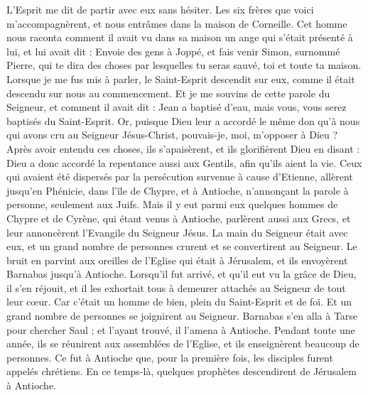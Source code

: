 \begin{multicols}{2}
{L'Esprit me dit de partir avec eux sans hésiter. Les six frères que voici m'accompagnèrent, et nous entrâmes dans la maison de Corneille.
Cet homme nous raconta comment il avait vu dans sa maison un ange qui s'était présenté à lui, et lui avait dit : Envoie des gens à Joppé, et fais venir Simon, surnommé Pierre,
qui te dira des choses par lesquelles tu seras sauvé, toi et toute ta maison.
Lorsque je me fus mis à parler, le Saint-Esprit descendit sur eux, comme il était descendu sur nous au commencement.
Et je me souvins de cette parole du Seigneur, et comment il avait dit : Jean a baptisé d'eau, mais vous, vous serez baptisés du Saint-Esprit.
Or, puisque Dieu leur a accordé le même don qu'à nous qui avons cru au Seigneur Jésus-Christ, pouvais-je, moi, m'opposer à Dieu ?
Après avoir entendu ces choses, ils s'apaisèrent, et ils glorifièrent Dieu en disant : Dieu a donc accordé la repentance aussi aux Gentils, afin qu'ils aient la vie.
Ceux qui avaient été dispersés par la persécution survenue à cause d'Etienne, allèrent jusqu'en Phénicie, dans l'île de Chypre, et à Antioche, n'annonçant la parole à personne, seulement aux Juifs.
Mais il y eut parmi eux quelques hommes de Chypre et de Cyrène, qui étant venus à Antioche, parlèrent aussi aux Grecs, et leur annoncèrent l'Evangile du Seigneur Jésus.
La main du Seigneur était avec eux, et un grand nombre de personnes crurent et se convertirent au Seigneur.
Le bruit en parvint aux oreilles de l'Eglise qui était à Jérusalem, et ils envoyèrent Barnabas jusqu'à Antioche.
Lorsqu'il fut arrivé, et qu'il eut vu la grâce de Dieu, il s'en réjouit, et il les exhortait tous à demeurer attachés au Seigneur de tout leur cœur.
Car c'était un homme de bien, plein du Saint-Esprit et de foi. Et un grand nombre de personnes se joignirent au Seigneur.
Barnabas s'en alla à Tarse pour chercher Saul ;
et l'ayant trouvé, il l'amena à Antioche. Pendant toute une année, ils se réunirent aux assemblées de l'Eglise, et ils enseignèrent beaucoup de personnes. Ce fut à Antioche que, pour la première fois, les disciples furent appelés chrétiens.
En ce temps-là, quelques prophètes descendirent de Jérusalem à Antioche.
}
\end{multicols}
